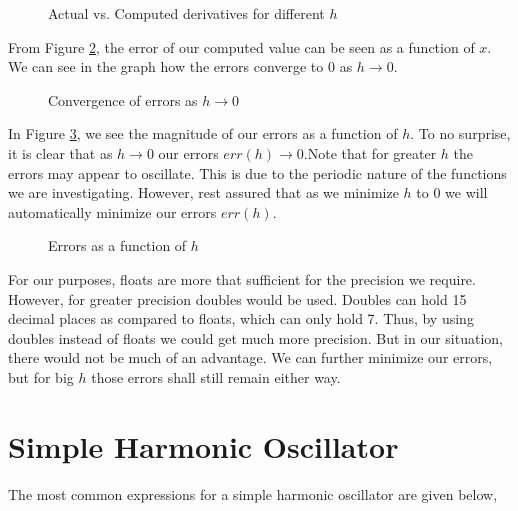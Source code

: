 \documentclass{article}
\begin{document}
\begin{figure}[H]
  \begin{center}
    \scalebox{.8}{}
  \end{center}
  \caption{Actual vs. Computed derivatives for different $h$}
  \label{fig:actual_computed}
\end{figure}

From Figure \ref{fig:derivative}, the error of our computed value can be seen as a function of $x$. We can see in the
graph how the errors converge to 0 as $h \to 0$.

\begin{figure}[H]
  \begin{center}
    \scalebox{.8}{}
  \end{center}
  \caption{Convergence of errors as $h\to 0$}
  \label{fig:derivative}
\end{figure}

In Figure \ref{fig:errors}, we see the magnitude of our errors as a function of $h$. To no
surprise, it is clear that as $h \to 0$ our errors $err(h) \to 0$.Note that for greater
$h$ the errors may appear to oscillate. This is due to the periodic nature of the functions we are
investigating. However, rest assured that as we minimize $h$ to $0$ we will automatically minimize
our errors $err(h)$.

\begin{figure}[H]
  \begin{center}
    \scalebox{.8}{}
  \end{center}
  \caption{Errors as a function of $h$}
  \label{fig:errors}
\end{figure}

For our purposes, floats are more that sufficient for the precision we require. However, for greater
precision doubles would be used. Doubles can hold 15 decimal places as compared to floats, which can
only hold 7. Thus, by using doubles instead of floats we could get much more precision. But in our situation,
there would not be much of an advantage. We can further minimize our errors, but for big $h$ those errors shall
still remain either way.


\section{Simple Harmonic Oscillator}

The most common expressions for a simple harmonic oscillator are given below,
\end{document}
